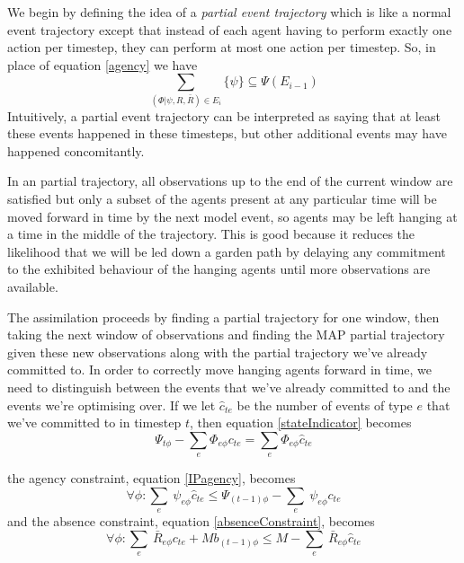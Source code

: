 \documentclass[sigconf]{aamas}
\begin{document}
We begin by defining the idea of a \textit{partial event trajectory} which is like a normal event trajectory except that instead of each agent having to perform exactly one action per timestep, they can perform at most one action per timestep. So, in place of equation \ref{agency} we have
\begin{equation}
\sum_{(\Phi|\psi,R,\bar{R})\in E_i}\{\psi\} \subseteq \Psi(E_{i-1})
\label{partial}
\end{equation}
Intuitively, a partial event trajectory can be interpreted as saying that at least these events happened in these timesteps, but other additional events may have happened concomitantly.

In an partial trajectory, all observations up to the end of the current window are satisfied but only a subset of the agents present at any particular time will be moved forward in time by the next model event, so agents may be left hanging at a time in the middle of the trajectory. This is good because it reduces the likelihood that we will be led down a garden path by delaying any commitment to the exhibited behaviour of the hanging agents until more observations are available.

The assimilation proceeds by finding a partial trajectory for one window, then taking the next window of observations and finding the MAP partial trajectory given these new observations along with the partial trajectory we've already committed to. In order to correctly move hanging agents forward in time, we need to distinguish between the events that we've already committed to and the events we're optimising over. If we let $\hat{c}_{te}$ be the number of events of type $e$ that we've committed to in timestep $t$, then equation \ref{stateIndicator} becomes
\begin{equation}
\Psi_{t\phi} -  \sum_e\Phi_{e\phi}c_{te} = \sum_e\Phi_{e\phi}\hat{c}_{te}
\label{stateIndicator}
\end{equation}


the agency constraint, equation \ref{IPagency}, becomes
\begin{equation}
\forall\phi:  \sum_e\ \psi_{e\phi}\hat{c}_{te} \le \Psi_{(t-1)\phi}  -  \sum_e\ \psi_{e\phi} c_{te}
\end{equation}
and the absence constraint, equation \ref{absenceConstraint}, becomes
\begin{equation}
\forall\phi: \sum_e\ \bar{R}_{e\phi} c_{te} + Mb_{(t-1)\phi} \le M - \sum_e\ \bar{R}_{e\phi} \hat{c}_{te}
\end{equation}
\end{document}
